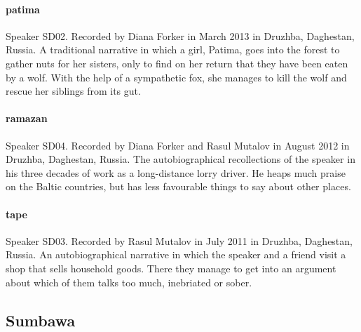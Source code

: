 \paragraph{patima}
Speaker SD02. Recorded by Diana Forker in March 2013 in Druzhba, Daghestan, Russia. A traditional narrative in which a girl, Patima, goes into the forest to gather nuts for her sisters, only to find on her return that they have been eaten by a wolf. With the help of a sympathetic fox, she manages to kill the wolf and rescue her siblings from its gut.

\paragraph{ramazan}
Speaker SD04. Recorded by Diana Forker and Rasul Mutalov in August 2012 in Druzhba, Daghestan, Russia. The autobiographical recollections of the speaker in his three decades of work as a long-distance lorry driver. He heaps much praise on the Baltic countries, but has less favourable things to say about other places.

\paragraph{tape}
Speaker SD03. Recorded by Rasul Mutalov in July 2011 in Druzhba, Daghestan, Russia. An autobiographical narrative in which the speaker and a friend visit a shop that sells household goods. There they manage to get into an argument about which of them talks too much, inebriated or sober.




\subsection{Sumbawa}
\label{ssec:corpus-sumbawa}

\noindent{}

